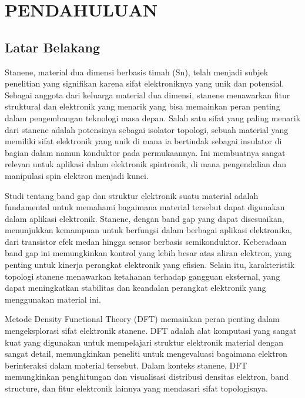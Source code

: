\renewcommand{\thechapter}{\Roman{chapter}}
\chapter{PENDAHULUAN}
\renewcommand{\thechapter}{\arabic{chapter}}
\pagestyle{konten}

\section{Latar Belakang}

Stanene, material dua dimensi berbasis timah (Sn), telah menjadi subjek penelitian yang signifikan karena sifat elektroniknya yang unik dan potensial. Sebagai anggota dari keluarga material dua dimensi, stanene menawarkan fitur struktural dan elektronik yang menarik yang bisa memainkan peran penting dalam pengembangan teknologi masa depan. Salah satu sifat yang paling menarik dari stanene adalah potensinya sebagai isolator topologi, sebuah material yang memiliki sifat elektronik yang unik di mana ia bertindak sebagai insulator di bagian dalam namun konduktor pada permukaannya. Ini membuatnya sangat relevan untuk aplikasi dalam elektronik spintronik, di mana pengendalian dan manipulasi spin elektron menjadi kunci.

Studi tentang band gap dan struktur elektronik suatu material adalah fundamental untuk memahami bagaimana material tersebut dapat digunakan dalam aplikasi elektronik. Stanene, dengan band gap yang dapat disesuaikan, menunjukkan kemampuan untuk berfungsi dalam berbagai aplikasi elektronika, dari transistor efek medan hingga sensor berbasis semikonduktor. Keberadaan band gap ini memungkinkan kontrol yang lebih besar atas aliran elektron, yang penting untuk kinerja perangkat elektronik yang efisien. Selain itu, karakteristik topologi stanene menawarkan ketahanan terhadap gangguan eksternal, yang dapat meningkatkan stabilitas dan keandalan perangkat elektronik yang menggunakan material ini.

Metode Density Functional Theory (DFT) memainkan peran penting dalam mengeksplorasi sifat elektronik stanene. DFT adalah alat komputasi yang sangat kuat yang digunakan untuk mempelajari struktur elektronik material dengan sangat detail, memungkinkan peneliti untuk mengevaluasi bagaimana elektron berinteraksi dalam material tersebut. Dalam konteks stanene, DFT memungkinkan penghitungan dan visualisasi distribusi densitas elektron, band structure, dan fitur elektronik lainnya yang mendasari sifat topologisnya. 

